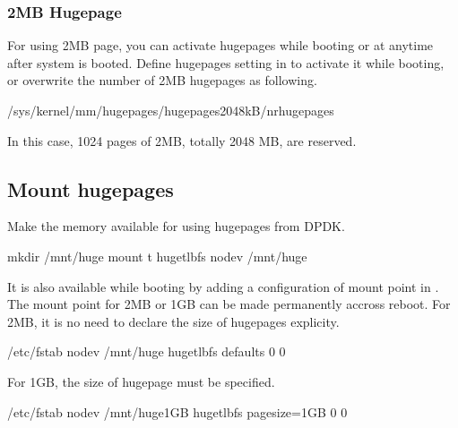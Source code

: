 \documentclass[a4paper,11pt,openany,oneside,english]{sphinxmanual}
\begin{document}
\subsubsection{2MB Hugepage}
\label{\detokenize{gsg/setup:mb-hugepage}}
For using 2MB page, you can activate hugepages while booting or at anytime
after system is booted.
Define hugepages setting in  to activate it while
booting, or overwrite the number of 2MB hugepages as following.

\begin{sphinxVerbatim}[commandchars=\\\{\},formatcom=\footnotesize]
   \PYGZgt{} /sys/kernel/mm/hugepages/hugepages\PYGZhy{}2048kB/nr\PYGZus{}hugepages
\end{sphinxVerbatim}

In this case, 1024 pages of 2MB, totally 2048 MB, are reserved.


\subsection{Mount hugepages}
\label{\detokenize{gsg/setup:mount-hugepages}}
Make the memory available for using hugepages from DPDK.

\begin{sphinxVerbatim}[commandchars=\\\{\},formatcom=\footnotesize]
 mkdir /mnt/huge
 mount \PYGZhy{}t hugetlbfs nodev /mnt/huge
\end{sphinxVerbatim}

It is also available while booting by adding a configuration of mount
point in .
The mount point for 2MB or 1GB can be made permanently accross reboot.
For 2MB, it is no need to declare the size of hugepages explicity.

\begin{sphinxVerbatim}[commandchars=\\\{\},formatcom=\footnotesize]
\PYGZsh{} /etc/fstab
nodev /mnt/huge hugetlbfs defaults 0 0
\end{sphinxVerbatim}

For 1GB, the size of hugepage  must be specified.

\begin{sphinxVerbatim}[commandchars=\\\{\},formatcom=\footnotesize]
\PYGZsh{} /etc/fstab
nodev /mnt/huge\PYGZus{}1GB hugetlbfs pagesize=1GB 0 0
\end{sphinxVerbatim}
\end{document}
